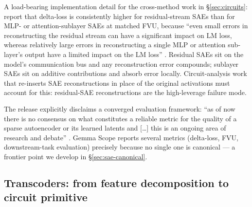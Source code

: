 A load-bearing implementation detail for the cross-method work in
\S\ref{sec:circuits}: \citet[\S 4.1]{gemma-scope-2024} report that
delta-loss is consistently higher for residual-stream SAEs than for
MLP- or attention-sublayer SAEs at matched FVU, because
``even small errors in reconstructing the residual stream can have a
significant impact on LM loss, whereas relatively large errors in
reconstructing a single MLP or attention sub-layer's output have a
limited impact on the LM loss'' \citep[\S 4.1]{gemma-scope-2024}.
Residual SAEs sit on the model's communication bus and any
reconstruction error compounds; sublayer SAEs sit on additive
contributions and absorb error locally. Circuit-analysis work that
re-inserts SAE reconstructions in place of the original activations
must account for this: residual-SAE reconstructions are the
high-leverage failure mode.

The release explicitly disclaims a converged evaluation framework:
``as of now there is no consensus on what constitutes a reliable metric
for the quality of a sparse autoencoder or its learned latents and
[\dots] this is an ongoing area of research and debate''
\citep[\S 4]{gemma-scope-2024}. Gemma Scope reports several metrics
(delta-loss, FVU, downstream-task evaluation) precisely because no
single one is canonical --- a frontier point we develop in
\S\ref{sec:sae-canonical}.

\subsection{Transcoders: from feature decomposition to circuit primitive}
\label{sec:sae-transcoders}

